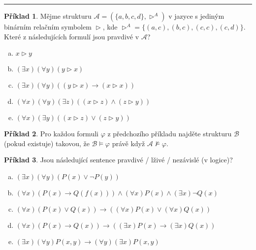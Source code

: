 \documentclass{amsart}
\theoremstyle{definition}
\newtheorem{problem}{Příklad}
\begin{document}
\smallskip\hrule

\bigskip\begin{problem}
Mějme strukturu $\mathcal{A}=(\{a,b,c,d\},\vartriangleright^{A})$ v jazyce s jediným binárním relačním symbolem $\vartriangleright$, kde $\vartriangleright^{A}=\{(a,c), (b,c), (c,c), (c,d)\}$. Které z následujících formulí jsou pravdivé v $\mathcal A$?
\begin{enumerate}[(a)]
   \item $x \vartriangleright y$
   \item $(\exists x)(\forall y)(y \vartriangleright x)$
   \item $(\exists x)(\forall y)((y \vartriangleright x) \to (x \vartriangleright x))$
   \item $(\forall x)(\forall y)(\exists z)((x \vartriangleright z)\wedge(z \vartriangleright y))$
   \item $(\forall x)(\exists y)((x \vartriangleright z)\vee(z \vartriangleright y))$
\end{enumerate}
\end{problem}

\bigskip\begin{problem}
Pro každou formuli $\varphi$ z předchozího příkladu najděte strukturu $\mathcal{B}$ (pokud existuje) takovou, že $\mathcal{B}\models \varphi$ právě když $\mathcal{A}\not\models \varphi$.
\end{problem}



\bigskip\begin{problem}
Jsou následující sentence pravdivé / lživé / nezávislé (v logice)?
\begin{enumerate}[(a)]
 \item $(\exists x)(\forall y)(P(x) \vee \neg P(y))$
\item $(\forall x)(P(x)\to Q(f(x))) \wedge (\forall x)P(x) \wedge (\exists x)\neg Q(x)$
  \item $(\forall x)(P(x) \vee Q(x)) \to ((\forall x)P(x) \vee (\forall x)Q(x))$
   \item $(\forall x)(P(x)\to Q(x)) \to ((\exists x)P(x)\to(\exists x)Q(x))$
\item $(\exists x)(\forall y)P(x,y) \to (\forall y)(\exists x)P(x,y)$
\end{enumerate}
\end{problem}
\end{document}
